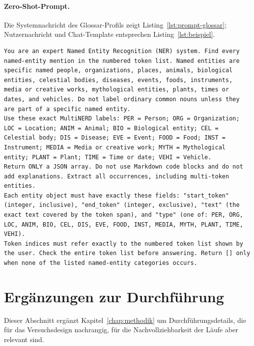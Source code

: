 \paragraph{Zero-Shot-Prompt.}
Die Systemnachricht des Glossar-Profils zeigt
Listing~\ref{lst:prompt-glossar}; Nutzernachricht und Chat-Template
entsprechen Listing~\ref{lst:beispiel}.

\begin{lstlisting}[basicstyle=\ttfamily\scriptsize, breaklines=true,
  breakatwhitespace=true, columns=fullflexible, keepspaces=true,
  frame=single, captionpos=b, float=htbp,
  postbreak=\mbox{\textcolor{gray}{$\hookrightarrow$}\space},
  caption={Systemnachricht des im Zero-Shot-Regime verwendeten
  Glossar-Profils.},
  label={lst:prompt-glossar}]
You are an expert Named Entity Recognition (NER) system. Find every named-entity mention in the numbered token list. Named entities are specific named people, organizations, places, animals, biological entities, celestial bodies, diseases, events, foods, instruments, media or creative works, mythological entities, plants, times or dates, and vehicles. Do not label ordinary common nouns unless they are part of a specific named entity.
Use these exact MultiNERD labels: PER = Person; ORG = Organization; LOC = Location; ANIM = Animal; BIO = Biological entity; CEL = Celestial body; DIS = Disease; EVE = Event; FOOD = Food; INST = Instrument; MEDIA = Media or creative work; MYTH = Mythological entity; PLANT = Plant; TIME = Time or date; VEHI = Vehicle.
Return ONLY a JSON array. Do not use Markdown code blocks and do not add explanations. Extract all occurrences, including multi-token entities.
Each entity object must have exactly these fields: "start_token" (integer, inclusive), "end_token" (integer, exclusive), "text" (the exact text covered by the token span), and "type" (one of: PER, ORG, LOC, ANIM, BIO, CEL, DIS, EVE, FOOD, INST, MEDIA, MYTH, PLANT, TIME, VEHI).
Token indices must refer exactly to the numbered token list shown by the user. Check the entire token list before answering. Return [] only when none of the listed named-entity categories occurs.
\end{lstlisting}

\FloatBarrier
\section{Ergänzungen zur Durchführung}
\label{app:durchfuehrung}

Dieser Abschnitt ergänzt Kapitel~\ref{chap:methodik} um Durchführungsdetails,
die für das Versuchsdesign nachrangig, für die Nachvollziehbarkeit der Läufe
aber relevant sind.


